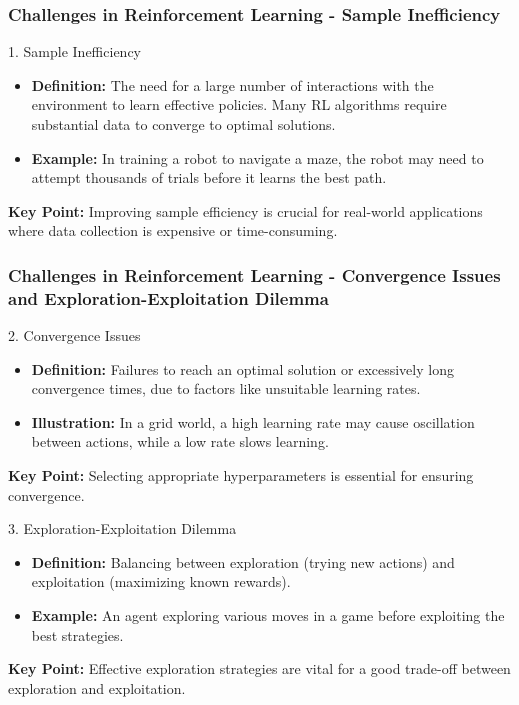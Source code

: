 \documentclass[aspectratio=169]{beamer}
\begin{document}
\begin{frame}[fragile]
    \frametitle{Challenges in Reinforcement Learning - Sample Inefficiency}
    \begin{block}{1. Sample Inefficiency}
        \begin{itemize}
            \item \textbf{Definition:} The need for a large number of interactions with the environment to learn effective policies. Many RL algorithms require substantial data to converge to optimal solutions.
            \item \textbf{Example:} In training a robot to navigate a maze, the robot may need to attempt thousands of trials before it learns the best path.
        \end{itemize}
    \end{block}
    
    \textbf{Key Point:} Improving sample efficiency is crucial for real-world applications where data collection is expensive or time-consuming.
\end{frame}

\begin{frame}[fragile]
    \frametitle{Challenges in Reinforcement Learning - Convergence Issues and Exploration-Exploitation Dilemma}
    \begin{block}{2. Convergence Issues}
        \begin{itemize}
            \item \textbf{Definition:} Failures to reach an optimal solution or excessively long convergence times, due to factors like unsuitable learning rates.
            \item \textbf{Illustration:} In a grid world, a high learning rate may cause oscillation between actions, while a low rate slows learning.
        \end{itemize}
    \end{block}
    
    \textbf{Key Point:} Selecting appropriate hyperparameters is essential for ensuring convergence.
    
    \begin{block}{3. Exploration-Exploitation Dilemma}
        \begin{itemize}
            \item \textbf{Definition:} Balancing between exploration (trying new actions) and exploitation (maximizing known rewards).
            \item \textbf{Example:} An agent exploring various moves in a game before exploiting the best strategies.
        \end{itemize}
    \end{block}
    
    \textbf{Key Point:} Effective exploration strategies are vital for a good trade-off between exploration and exploitation.
\end{frame}
\end{document}
